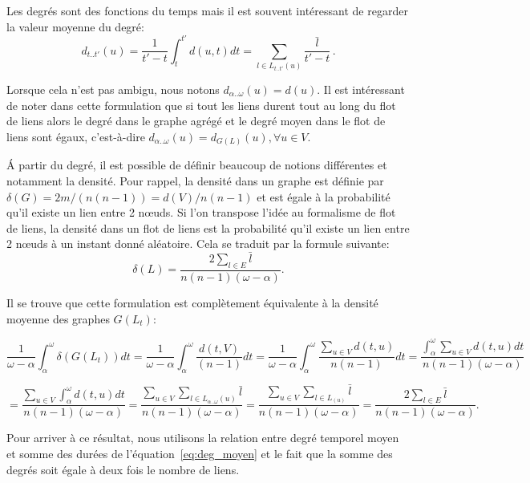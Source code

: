 Les degrés sont des fonctions du temps mais il est souvent intéressant de regarder la valeur moyenne du degré:
\begin{equation}
d_{t..t'}(u)=\dfrac{1}{t'-t}  \int_{t}^{t'}d(u,t) dt = \sum_{l \in L_{t..t'}(u)} \dfrac{\bar{l}}{t'-t} \, .
\label{eq:deg_moyen}
\end{equation}

Lorsque cela n'est pas ambigu, nous notons $d_{\alpha..\omega}(u) = d(u)$.
Il est intéressant de noter dans cette formulation que si tout les liens durent tout au long du flot de liens alors le degré dans le graphe agrégé et le degré moyen dans le flot de liens sont égaux, c'est-à-dire  $d_{\alpha..\omega}(u) = d_{G(L)}(u), \forall u \in V$.

\'A partir du degré, il est possible de définir beaucoup de notions différentes et notamment la densité.
Pour rappel, la densité dans un graphe est définie par $\delta(G)=2m/(n(n-1))=d(V)/n(n-1)$ et est égale à la probabilité qu'il existe un lien entre 2 n\oe uds.
Si l'on transpose l'idée au formalisme de flot de liens, la densité dans un flot de liens est la probabilité qu'il existe un lien entre 2 n\oe uds à un instant donné aléatoire.
Cela se traduit par la formule suivante:
\begin{equation}
\delta(L)= \dfrac{2 \sum_{l \in E}\bar{l}}{n(n-1) (\omega-\alpha)}.
\end{equation}

Il se trouve que cette formulation est complètement équivalente à la densité moyenne des graphes $G(L_t)$:

\begin{equation*}
\dfrac{1}{\omega-\alpha} \int_{\alpha}^{\omega} \delta(G(L_t)) dt=
\dfrac{1}{\omega-\alpha} \int_{\alpha}^{\omega} \dfrac{d(t,V)}{(n-1)}dt=
 \dfrac{1}{\omega-\alpha} \int_{\alpha}^{\omega} \dfrac{\sum_{u \in V} d(t,u)}{n(n-1)}dt = 
 \dfrac{\int_{\alpha}^{\omega} \sum_{u \in V} d(t,u)dt}{n(n-1)(\omega-\alpha)} 
 \end{equation*}

 \begin{equation*}
 =
\dfrac{\sum_{u \in V} \int_{\alpha}^{\omega}d(t,u)dt}{n(n-1)(\omega-\alpha)} =
\dfrac{\sum_{u \in V} \sum_{l \in L_{\alpha..\omega}(u)} \bar{l}}{n(n-1)(\omega-\alpha)} =
\dfrac{\sum_{u \in V} \sum_{l \in L_(u)} \bar{l}}{n(n-1)(\omega-\alpha)}=
\dfrac{2\sum_{l \in E}\bar{l}}{n(n-1) (\omega-\alpha)} .
\end{equation*}

Pour arriver à ce résultat, nous utilisons la relation entre degré temporel moyen et somme des durées de l'équation~\ref{eq:deg_moyen} et le fait que la somme des degrés soit égale à deux fois le nombre de liens.


